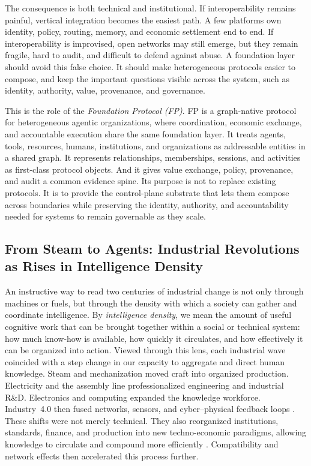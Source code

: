 \documentclass{foundationpaper}
\begin{document}
The consequence is both technical and institutional. If interoperability remains painful, vertical integration becomes the easiest path. A few platforms own identity, policy, routing, memory, and economic settlement end to end. If interoperability is improvised, open networks may still emerge, but they remain fragile, hard to audit, and difficult to defend against abuse. A foundation layer should avoid this false choice. It should make heterogeneous protocols easier to compose, and keep the important questions visible across the system, such as identity, authority, value, provenance, and governance.

This is the role of the \emph{Foundation Protocol (FP)}. FP is a graph-native protocol for heterogeneous agentic organizations, where coordination, economic exchange, and accountable execution share the same foundation layer. It treats agents, tools, resources, humans, institutions, and organizations as addressable entities in a shared graph. It represents relationships, memberships, sessions, and activities as first-class protocol objects. And it gives value exchange, policy, provenance, and audit a common evidence spine.
Its purpose is not to replace existing protocols. It is to provide the control-plane substrate that lets them compose across boundaries while preserving the identity, authority, and accountability needed for systems to remain governable as they scale.


\subsection{From Steam to Agents: Industrial Revolutions as Rises in Intelligence Density}
\label{subsec:intel-density}

An instructive way to read two centuries of industrial change is not only through machines or fuels, but through the density with which a society can gather and coordinate intelligence. By \emph{intelligence density}, we mean the amount of useful cognitive work that can be brought together within a social or technical system: how much know-how is available, how quickly it circulates, and how effectively it can be organized into action. Viewed through this lens, each industrial wave coincided with a step change in our capacity to aggregate and direct human knowledge. Steam and mechanization moved craft into organized production. Electricity and the assembly line professionalized engineering and industrial R\&D. Electronics and computing expanded the knowledge workforce. Industry~4.0 then fused networks, sensors, and cyber--physical feedback loops \cite{schwab2016fourth,hermann2016industrie}. These shifts were not merely technical. They also reorganized institutions, standards, finance, and production into new techno-economic paradigms, allowing knowledge to circulate and compound more efficiently \cite{perez2002technological}. Compatibility and network effects then accelerated this process further\cite{katz1985network}.
\end{document}
